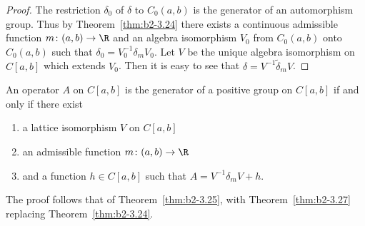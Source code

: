 \begin{proof}
The restriction $\delta_{0}$ of\/ $\delta$ to $C_{0}(a,b)$ is the generator of an automorphism group.
Thus by Theorem~\ref{thm:b2-3.24} there exists a continuous admissible function $m \colon (a,b) \to \R$ and an algebra isomorphism $V_{0}$ from $C_{0}(a,b)$ onto $C_{0}(a,b)$ such that $\delta_{0} = V_{0}^{-1}\delta_{m}V_{0}$.
Let $V$ be the unique algebra isomorphism on $C[a,b]$ which extends $V_{0}$.
Then it is easy to see that $\delta = V^{-1}\tilde{\delta}_{m}V$.
\end{proof}
\begin{theorem}\label{thm:b2-3.28}
%
An operator $A$ on $C[a,b]$ is the generator of a positive group on $C[a,b]$ if and only if there exist
\begin{enumerate}[\upshape (i)]
\item 
a lattice isomorphism $V$ on $C[a,b]$
\item 
an admissible function $m \colon (a,b) \to \R$
\item 
and a function $h \in C[a,b]$ such that $A = V^{-1}\delta_{m}V + h$.
\end{enumerate}
\end{theorem}
The proof follows that of Theorem~\ref{thm:b2-3.25}, with
Theorem~\ref{thm:b2-3.27} replacing Theorem~\ref{thm:b2-3.24}.

